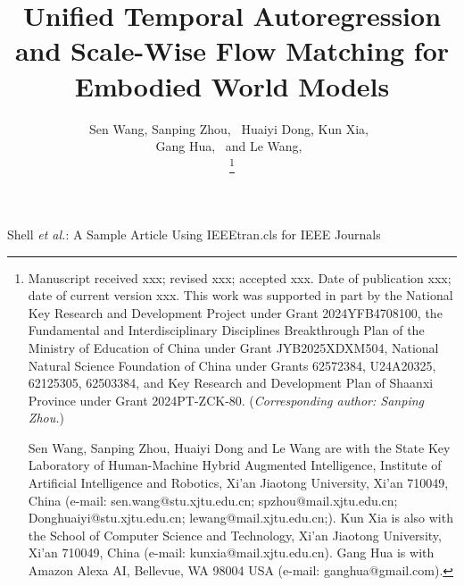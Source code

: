 \documentclass[journal]{IEEEtran}
\begin{document}
\title{
Unified Temporal Autoregression and Scale-Wise Flow Matching for Embodied World Models
}


\author{Sen Wang, %
        Sanping Zhou,~ 
        Huaiyi Dong, %
        Kun Xia,~ \\
        Gang Hua,~
        and Le Wang,~%
        
\thanks{Manuscript received xxx; revised xxx; accepted xxx. Date of publication xxx; date of current version xxx. 
This work was supported in part by the National Key Research and Development Project under Grant 2024YFB4708100, the Fundamental and Interdisciplinary Disciplines Breakthrough Plan of the Ministry of Education of China under Grant JYB2025XDXM504, National Natural Science Foundation of China under Grants 62572384, U24A20325, 62125305, 62503384, and Key Research and Development Plan of Shaanxi Province under Grant 2024PT-ZCK-80. (\textit{Corresponding author: Sanping Zhou.})

Sen Wang, Sanping Zhou, Huaiyi Dong and Le Wang are with the State Key Laboratory of Human-Machine Hybrid Augmented Intelligence, Institute of Artificial Intelligence and Robotics, Xi'an Jiaotong University, Xi’an 710049, China (e-mail: sen.wang@stu.xjtu.edu.cn; spzhou@mail.xjtu.edu.cn; Donghuaiyi@stu.xjtu.edu.cn; lewang@mail.xjtu.edu.cn;). 
Kun Xia is also with the School of Computer Science and Technology, Xi’an Jiaotong University, Xi’an 710049, China (e-mail: kunxia@mail.xjtu.edu.cn). 
Gang Hua is with Amazon Alexa AI, Bellevue, WA 98004 USA (e-mail: ganghua@gmail.com).
}%
}

%
{Shell \MakeLowercase{\textit{et al.}}: A Sample Article Using IEEEtran.cls for IEEE Journals}
\end{document}

